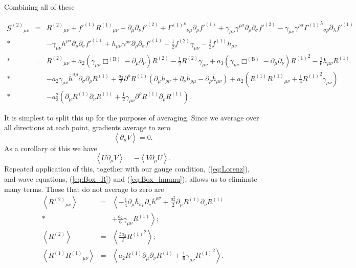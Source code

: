 \documentclass[aps,prd,amsfonts,amssymb,amsmath,nofootinbib,reprint,showpacs]{revtex4-1}
\newcommand{\eqnref}[1]{(\ref{eq:#1})}
\newcommand{\recip}[1]{\ensuremath{\frac{1}{#1}}}
\begin{document}
Combining all of these
\begin{widetext}
\begin{eqnarray}
{\mathcal{G}^{(2)}}_{\mu\nu} & = & {R^{(2)}}_{\mu\nu} + f'^{(1)}{R^{(1)}}_{\mu\nu} - \partial_\mu\partial_\nu f'^{(2)} + {{\Gamma^{(1)}}^\rho}_{\nu\mu}\partial_\rho f'^{(1)} + \gamma_{\mu\nu}\gamma^{\rho\sigma}\partial_\rho\partial_\sigma f'^{(2)} - \gamma_{\mu\nu}\gamma^{\rho\sigma}{{\Gamma^{(1)}}^\lambda}_{\sigma\rho}\partial_\lambda f'^{(1)} \nonumber \\*
 & & - {} \gamma_{\mu\nu}h^{\rho\sigma}\partial_\rho\partial_\sigma f'^{(1)} + h_{\mu\nu}\gamma^{\rho\sigma}\partial_\rho\partial_\sigma f'^{(1)} - \recip{2}f^{(2)}\gamma_{\mu\nu} - \recip{2}f^{(1)}h_{\mu\nu} \nonumber \\*
 & = & {R^{(2)}}_{\mu\nu} + a_2\left(\gamma_{\mu\nu}\Box^{(\text{B})} - \partial_\mu\partial_\nu\right)R^{(2)} - \recip{2}R^{(2)}\gamma_{\mu\nu} + a_3\left(\gamma_{\mu\nu}\Box^{(\text{B})} - \partial_\mu\partial_\nu\right){R^{(1)}}^2 - \recip{6}\overline{h}_{\mu\nu}R^{(1)} \nonumber \\*
 & & - {} a_2\gamma_{\mu\nu}\overline{h}^{\sigma\rho}\partial_\sigma\partial_\rho R^{(1)} + \frac{a_2}{2} \partial^\rho R^{(1)} \left(\partial_\mu\overline{h}_{\rho\nu} + \partial_\nu\overline{h}_{\rho\mu} - \partial_\rho\overline{h}_{\mu\nu}\right) + a_2\left(R^{(1)}{R^{(1)}}_{\mu\nu} + \recip{4}{R^{(1)}}^2\gamma_{\mu\nu}\right) \nonumber \\*
 & & - {} a_2^2\left(\partial_\mu R^{(1)}\partial_\nu R^{(1)} + \recip{2} \gamma_{\mu\nu}\partial^\rho R^{(1)}\partial_\rho R^{(1)}\right).
\end{eqnarray}
\end{widetext}
It is simplest to split this up for the purposes of averaging. Since we average over all directions at each point, gradients average to zero~\cite{Hobson2006, Stein2011}
\begin{equation}
\left\langle\partial_\mu V\right\rangle = 0.
\end{equation}
As a corollary of this we have
\begin{equation}
\left\langle U\partial_\mu V\right\rangle = -\left\langle V \partial_\mu U\right\rangle.
\end{equation}
Repeated application of this, together with our gauge condition, \eqnref{Lorenz}, and wave equations, \eqnref{Box_R} and \eqnref{Box_hmunu}, allows us to eliminate many terms. Those that do not average to zero are
\begin{eqnarray}
\left\langle {R^{(2)}}_{\mu\nu} \right\rangle & = & \left\langle -\recip{4} \partial_\mu\overline{h}_{\sigma\rho}\partial_\nu\overline{h}^{\rho\sigma} + \frac{a_2^2}{2}\partial_\mu R^{(1)}\partial_\nu R^{(1)} \right. \nonumber \\* 
 & & + \left. \frac{a_2}{6}\gamma_{\mu\nu}R^{(1)} \right\rangle; \\
\left\langle R^{(2)} \right\rangle & = & \left\langle \frac{3a_2}{2}{R^{(1)}}^2 \right\rangle; \\
\left\langle R^{(1)}{R^{(1)}}_{\mu\nu} \right\rangle & = & \left\langle a_2 R^{(1)} \partial_\mu\partial_\nu R^{(1)} + \recip{6}\gamma_{\mu\nu}{R^{(1)}}^2\right\rangle.
\end{eqnarray}
\end{document}
